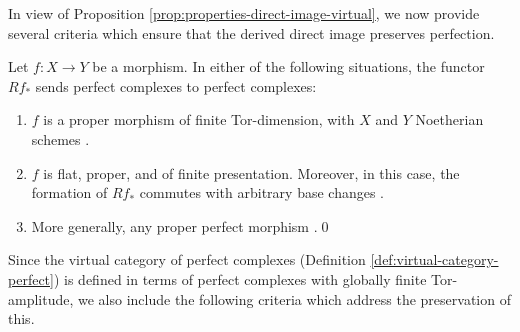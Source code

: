 In view of Proposition \ref{prop:properties-direct-image-virtual}, we now provide several criteria which ensure that the derived direct image preserves perfection.
\begin{proposition}\label{prop:perfect-conditions}
Let $f: X\to Y$ be a morphism. In either of the following situations, the functor $Rf_\ast$ sends perfect complexes to perfect complexes:
\begin{enumerate}
\item\label{item:perfect-conditions-1} $f$ is a proper morphism of finite Tor-dimension, with $X$ and $Y$ Noetherian schemes \cite[\href{https://stacks.math.columbia.edu/tag/0B6G}{0B6G}]{stacks-project} \cite[\href{https://stacks.math.columbia.edu/tag/0684}{0684}]{stacks-project}
\cite[\href{https://stacks.math.columbia.edu/tag/069C}{069C}]{stacks-project}.
\item\label{item:perfect-conditions-2} $f$ is flat, proper, and of finite presentation. Moreover, in this case, the formation of $Rf_\ast $ commutes with arbitrary base changes \cite[\href{https://stacks.math.columbia.edu/tag/0B91}{0B91}]{stacks-project}.
\item\label{item:perfect-conditions-3} More generally, any proper perfect morphism \cite[Ex.\,2.2(a)]{LipNee}.\qed
\end{enumerate}
\end{proposition}

Since the virtual category of perfect complexes (\cf Definition \ref{def:virtual-category-perfect}) is defined in terms of perfect complexes with globally finite Tor-amplitude, we also include the following criteria which address the preservation of this.

